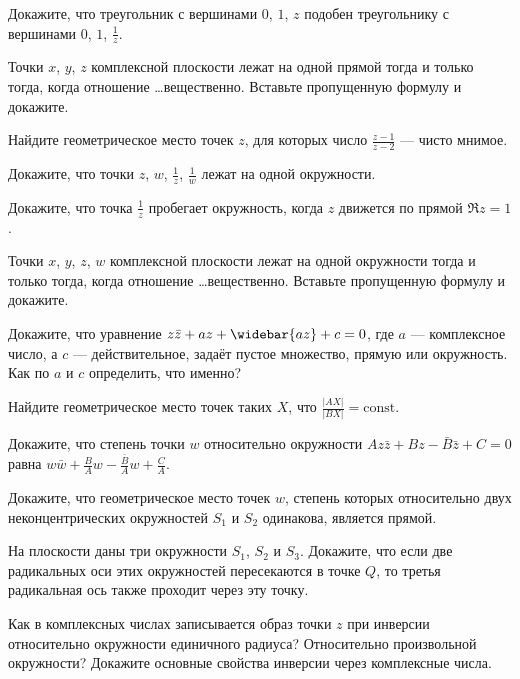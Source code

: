 \documentclass[a4paper, 12pt, num=23]{listok}
\begin{document}
\begin{problem}
	Докажите, что треугольник с вершинами $0$, $1$, $z$ подобен треугольнику с вершинами $0$, $1$, $\frac1z$.
\end{problem}
\begin{problem}
	Точки $x$, $y$, $z$ комплексной плоскости лежат на одной прямой тогда и только тогда, когда отношение \dots вещественно. Вставьте пропущенную формулу и докажите.
\end{problem}
\begin{problem}
	Найдите геометрическое место точек $z$, для которых число $\frac{z-1}{z-2}$ --- чисто мнимое.
\end{problem}
\begin{problem}
	Докажите, что точки $z$, $w$, $\frac1z$, $\frac1w$ лежат на одной окружности.
\end{problem}
\begin{problem}
	Докажите, что точка $\frac1z$ пробегает окружность, когда $z$ движется по прямой $\Re z = 1$.
\end{problem}
\begin{problem}
	Точки $x$, $y$, $z$, $w$ комплексной плоскости лежат на одной окружности тогда и только тогда, когда отношение \dots вещественно.
	Вставьте пропущенную формулу и докажите.
\end{problem}
\begin{problem}
	Докажите, что уравнение $z\bar z + az + \widebar{az} + c = 0$, где $a$ --- комплексное число,
	а $c$ --- действительное, задаёт пустое множество, прямую или окружность. Как по $a$ и $c$ определить, что именно?
\end{problem}
\begin{problem}
	Найдите геометрическое место точек таких $X$, что $\frac{|AX|}{|BX|} = \mathrm{const}$.
\end{problem}
\begin{problem}
	Докажите, что степень точки $w$ относительно окружности $Az\bar z + Bz - \bar B \bar z + C = 0$ равна
	$w\bar w + \frac B A w - \frac{\bar B}A w + \frac C A$.
\end{problem}
\begin{problem}
	Докажите, что геометрическое место точек $w$, степень которых относительно двух неконцентрических окружностей $S_1$ и $S_2$ одинакова, является прямой.
\end{problem}
\begin{problem}
	На плоскости даны три окружности $S_1$, $S_2$ и $S_3$.
	Докажите, что если две радикальных оси этих окружностей пересекаются в точке $Q$, то третья радикальная ось также проходит через эту точку.
\end{problem}
\begin{problem}
	Как в комплексных числах записывается образ точки $z$ при инверсии относительно окружности единичного радиуса?
	Относительно произвольной окружности? Докажите основные свойства инверсии через комплексные числа.
\end{problem}
\end{document}
